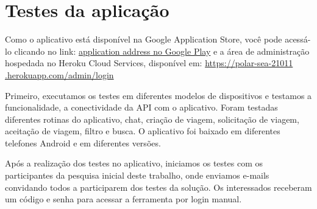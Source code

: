 
\section{Testes da aplicação}
Como o aplicativo está disponível na Google Application Store, você pode acessá-lo clicando no link: \href{https://play.google.com/store/apps/details?id=com.unifap.caronaeunifap}{application address no Google Play} e a área de administração hospedada no Heroku Cloud Services, disponível em: \href{https://polar-sea-21011.herokuapp.com/admin/login}{https://polar-sea-21011 .herokuapp.com/admin/login}

Primeiro, executamos os testes em diferentes modelos de dispositivos e testamos a funcionalidade, a conectividade da API com o aplicativo. Foram testadas diferentes rotinas do aplicativo, chat, criação de viagem, solicitação de viagem, aceitação de viagem, filtro e busca. O aplicativo foi baixado em diferentes telefones Android e em diferentes versões.

Após a realização dos testes no aplicativo, iniciamos os testes com os participantes da pesquisa inicial deste trabalho, onde enviamos e-mails convidando todos a participarem dos testes da solução. Os interessados receberam um código e senha para acessar a ferramenta por login manual.

